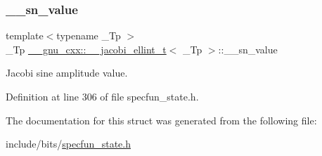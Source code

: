 \subsubsection{\texorpdfstring{\+\_\+\+\_\+sn\+\_\+value}{\_\_sn\_value}}
{\footnotesize\ttfamily template$<$typename \+\_\+\+Tp $>$ \\
\+\_\+\+Tp \hyperlink{struct____gnu__cxx_1_1____jacobi__ellint__t}{\+\_\+\+\_\+gnu\+\_\+cxx\+::\+\_\+\+\_\+jacobi\+\_\+ellint\+\_\+t}$<$ \+\_\+\+Tp $>$\+::\+\_\+\+\_\+sn\+\_\+value}



Jacobi sine amplitude value. 



Definition at line 306 of file specfun\+\_\+state.\+h.



The documentation for this struct was generated from the following file\+:\begin{DoxyCompactItemize}
\item 
include/bits/\hyperlink{specfun__state_8h}{specfun\+\_\+state.\+h}\end{DoxyCompactItemize}
